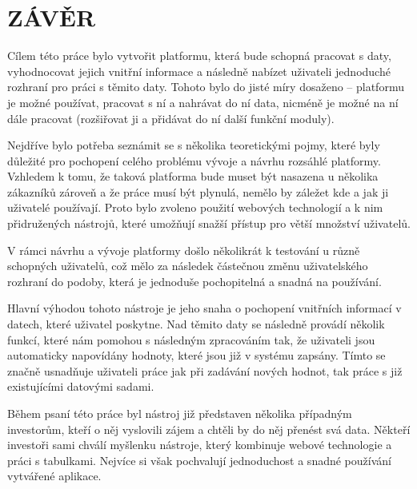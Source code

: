 \chapter*{ZÁVĚR}
\par Cílem této práce bylo vytvořit platformu, která bude schopná pracovat s daty, vyhodnocovat jejich vnitřní informace a následně nabízet uživateli jednoduché rozhraní pro práci s těmito daty. Tohoto bylo do jisté míry dosaženo -- platformu je možné používat, pracovat s ní a nahrávat do ní data, nicméně je možné na ní dále pracovat (rozšiřovat ji a přidávat do ní další funkční moduly).

\par Nejdříve bylo potřeba seznámit se s několika teoretickými pojmy, které byly důležité pro pochopení celého problému vývoje a návrhu rozsáhlé platformy. Vzhledem k tomu, že taková platforma bude muset být nasazena u několika zákazníků zároveň a že práce musí být plynulá, nemělo by záležet kde a jak ji uživatelé používají. Proto bylo zvoleno použití webových technologií a k nim přidružených nástrojů, které umožňují snažší přístup pro větší množství uživatelů.

\par V rámci návrhu a vývoje platformy došlo několikrát k testování u různě schopných uživatelů, což mělo za následek částečnou změnu uživatelského rozhraní do podoby, která je  jednoduše pochopitelná a snadná na používání.

\par Hlavní výhodou tohoto nástroje je jeho snaha o pochopení vnitřních informací v datech, které uživatel poskytne. Nad těmito daty se následně provádí několik funkcí, které nám pomohou s následným zpracováním tak, že uživateli jsou automaticky napovídány hodnoty, které jsou již v systému zapsány. Tímto se značně usnadňuje uživateli práce jak při zadávání nových hodnot, tak práce s již existujícími datovými sadami.

\par Během psaní této práce byl nástroj již představen několika případným investorům, kteří o něj vyslovili zájem a chtěli by do něj přenést svá data. Někteří investoři sami chválí myšlenku nástroje, který kombinuje webové technologie a práci s tabulkami. Nejvíce si však pochvalují jednoduchost a snadné používání vytvářené aplikace.